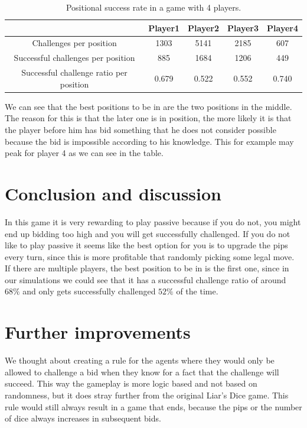 \documentclass{article}
\begin{document}
\begin{table}[h!]
    \centering
    \begin{tabular}{c|c|c|c|c}
        &Player1 & Player2 & Player3 & Player4  \\
        \hline
        Challenges per position & 1303 & 5141 & 2185 & 607\\
        Successful challenges per position & 885 & 1684 & 1206 & 449\\
        Successful challenge ratio per position & 0.679 & 0.522 & 0.552 & 0.740\\
    \end{tabular}
    \caption{Positional success rate in a game with 4 players.}
    \label{tab:battleroyale}
\end{table}
We can see that the best positions to be in are the two positions in the middle. The reason for this is that the later one is in position, the more likely it is that the player before him has bid something that he does not consider possible because the bid is impossible according to his knowledge. This for example may peak for player 4 as we can see in the table.
\section*{Conclusion and discussion}
In this game it is very rewarding to play passive because if you do not, you might end up bidding too high and you will get successfully challenged. If you do not like to play passive it seems like the best option for you is to upgrade the pips every turn, since this is more profitable that randomly picking some legal move. If there are multiple players, the best position to be in is the first one, since in our simulations we could see that it has a successful challenge ratio of around $68\%$ and only gets successfully challenged $52\%$ of the time.

\section*{Further improvements}
We thought about creating a rule for the agents where they would only be allowed to challenge a bid when they know for a fact that the challenge will succeed. This way the gameplay is more logic based and not based on randomness, but it does stray further from the original Liar's Dice game. This rule would still always result in a game that ends, because the pips or the number of dice always increases in subsequent bids.


%
\end{document}
